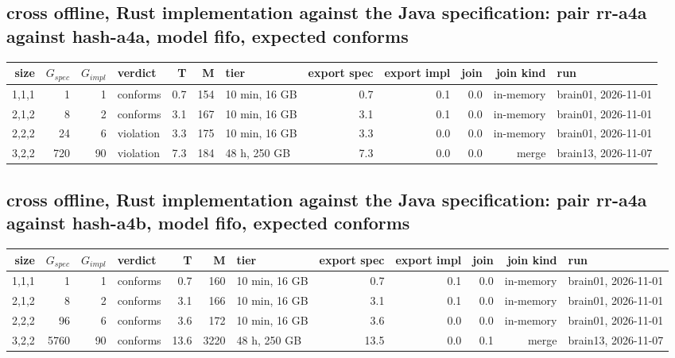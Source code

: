 \documentclass[10pt]{article}
\begin{document}
\subsection*{cross offline, Rust implementation against the Java specification: pair \textsf{rr-a4a} against \textsf{hash-a4a}, model fifo, expected conforms}
\begin{longtable}{@{}rrrlrrlrrrrl@{}}
\toprule
size & $G_{\mathit{spec}}$ & $G_{\mathit{impl}}$ & verdict & T & M & tier & export spec & export impl & join & join kind & run \\
\midrule
\endhead
\color{red} 1,1,1 & 1 & 1 & conforms & 0.7 & 154 & 10 min, 16 GB & 0.7 & 0.1 & 0.0 & in-memory & brain01, 2026-11-01 \\
\color{red} 2,1,2 & 8 & 2 & conforms & 3.1 & 167 & 10 min, 16 GB & 3.1 & 0.1 & 0.0 & in-memory & brain01, 2026-11-01 \\
\color{red} 2,2,2 & 24 & 6 & violation & 3.3 & 175 & 10 min, 16 GB & 3.3 & 0.0 & 0.0 & in-memory & brain01, 2026-11-01 \\
\color{red} 3,2,2 & 720 & 90 & violation & 7.3 & 184 & 48 h, 250 GB & 7.3 & 0.0 & 0.0 & merge & brain13, 2026-11-07 \\
\bottomrule
\end{longtable}
\subsection*{cross offline, Rust implementation against the Java specification: pair \textsf{rr-a4a} against \textsf{hash-a4b}, model fifo, expected conforms}
\begin{longtable}{@{}rrrlrrlrrrrl@{}}
\toprule
size & $G_{\mathit{spec}}$ & $G_{\mathit{impl}}$ & verdict & T & M & tier & export spec & export impl & join & join kind & run \\
\midrule
\endhead
\color{red} 1,1,1 & 1 & 1 & conforms & 0.7 & 160 & 10 min, 16 GB & 0.7 & 0.1 & 0.0 & in-memory & brain01, 2026-11-01 \\
\color{red} 2,1,2 & 8 & 2 & conforms & 3.1 & 166 & 10 min, 16 GB & 3.1 & 0.1 & 0.0 & in-memory & brain01, 2026-11-01 \\
\color{red} 2,2,2 & 96 & 6 & conforms & 3.6 & 172 & 10 min, 16 GB & 3.6 & 0.0 & 0.0 & in-memory & brain01, 2026-11-01 \\
\color{red} 3,2,2 & 5760 & 90 & conforms & 13.6 & 3220 & 48 h, 250 GB & 13.5 & 0.0 & 0.1 & merge & brain13, 2026-11-07 \\
\bottomrule
\end{longtable}
\end{document}
